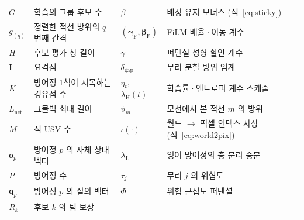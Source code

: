 \begin{table}[!b]
{\begin{tabular}{@{}ll@{\hspace{1.6em}}ll@{}}
$G$              & 학습의 그룹 후보 수                        & $\beta$        & 배정 유지 보너스 (식~\ref{eq:sticky}) \\
$g_{(q)}$        & 정렬한 적선 방위의 $q$ 번째 간격           & $(\boldsymbol{\gamma}_{\mathrm{F}},\boldsymbol{\beta}_{\mathrm{F}})$ & FiLM 배율·이동 계수 \\
$H$              & 후보 평가 창 길이                          & $\gamma$       & 퍼텐셜 성형 할인 계수 \\
$\mathbf{I}$     & 요격점                                     & $\delta_{\mathrm{gap}}$ & 무리 분할 방위 임계 \\
$K$              & 방어정 1척이 지목하는 경유점 수            & $\eta_t$, $\lambda_{\mathrm{H}}(t)$ & 학습률·엔트로피 계수 스케줄 \\
$L_{\mathrm{net}}$ & 그물벽 최대 길이                         & $\vartheta_m$  & 모선에서 본 적선 $m$ 의 방위 \\
$M$              & 적 USV 수                                  & $\iota(\cdot)$ & 월드 $\to$ 픽셀 인덱스 사상 (식~\ref{eq:world2pix}) \\
$\mathbf{o}_p$   & 방어정 $p$ 의 자체 상태 벡터               & $\lambda_{\mathrm{L}}$ & 잉여 방어정의 층 분리 증분 \\
$P$              & 방어정 수                                  & $\tau_j$       & 무리 $j$ 의 위협도 \\
$\mathbf{q}_p$   & 방어정 $p$ 의 질의 벡터                    & $\Phi$         & 위협 근접도 퍼텐셜 \\
$R_k$            & 후보 $k$ 의 팀 보상                        &                &  \\
\bottomrule
\end{tabular}}
\end{table}
